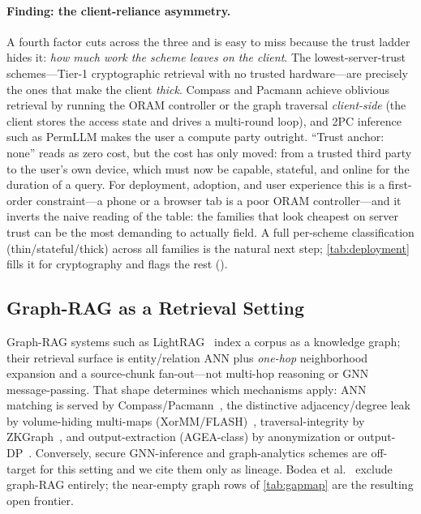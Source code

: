 
\paragraph{Finding: the client-reliance asymmetry.}
A fourth factor cuts across the three and is easy to miss because the trust ladder hides
it: \emph{how much work the scheme leaves on the client}. The lowest-server-trust
schemes---Tier-1 cryptographic retrieval with no trusted hardware---are precisely the ones
that make the client \emph{thick}. Compass and Pacmann achieve oblivious retrieval by
running the ORAM controller or the graph traversal \emph{client-side} (the client stores
the access state and drives a multi-round loop), and 2PC inference such as PermLLM makes
the user a compute party outright. ``Trust anchor: none'' reads as zero cost, but the cost
has only moved: from a trusted third party to the user's own device, which must now be
capable, stateful, and online for the duration of a query. For deployment, adoption, and
user experience this is a first-order constraint---a phone or a browser tab is a poor ORAM
controller---and it inverts the naive reading of the table: the families that look cheapest
on server trust can be the most demanding to actually field. A full per-scheme
classification (thin/stateful/thick) across all families is the natural next step;
\cref{tab:deployment} fills it for cryptography and flags the rest (\tq).

\subsection{Graph-RAG as a Retrieval Setting}
Graph-RAG systems such as LightRAG~\citep{guo_lightrag} index a corpus as a knowledge
graph; their retrieval surface is entity/relation ANN plus \emph{one-hop} neighborhood
expansion and a source-chunk fan-out---not multi-hop reasoning or GNN message-passing.
That shape determines which mechanisms apply: ANN matching is served by
Compass/Pacmann~\citep{zhu_compass,pacmann}, the distinctive adjacency/degree leak by
volume-hiding multi-maps (XorMM/FLASH)~\citep{xormm,flash_emm}, traversal-integrity by
ZKGraph~\citep{zkgraph}, and output-extraction (AGEA-class) by anonymization or
output-DP~\citep{ning_arog,tan_privgemo,tang_dprag}. Conversely, secure GNN-inference
and graph-analytics schemes are off-target for this setting and we cite them only as
lineage. Bodea et al.~\citep{bodea_sok} exclude graph-RAG entirely; the near-empty
graph rows of \cref{tab:gapmap} are the resulting open frontier.

